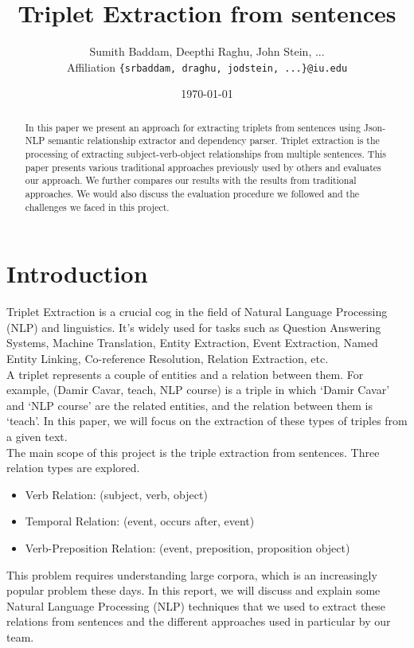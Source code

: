 \documentclass[11pt,letterpaper]{article}
\title{Triplet Extraction from sentences}
\author{Sumith Baddam, Deepthi Raghu, John Stein, ... \\
  Affiliation
  {\tt \{srbaddam, draghu, jodstein, ...\}@iu.edu} \\}
\date{\today}
\begin{document}
\maketitle

\begin{abstract}
  In this paper we present an approach for extracting triplets from sentences using Json-NLP semantic relationship extractor and dependency parser. Triplet extraction is the processing of extracting subject-verb-object relationships from multiple sentences. This paper presents various traditional approaches previously used by others and evaluates our approach. We further compares our results with the results from traditional approaches. We would also discuss the evaluation procedure we followed and the challenges we faced in this project.
\end{abstract}

\section{Introduction}

Triplet Extraction is a crucial cog in the field of Natural Language Processing (NLP) and linguistics. It’s widely used for tasks such as Question Answering Systems, Machine Translation, Entity Extraction, Event Extraction, Named Entity Linking, Co-reference Resolution, Relation Extraction, etc.\\

A triplet represents a couple of entities and a relation between them. For example, (Damir Cavar, teach, NLP course) is a triple in which ‘Damir Cavar’ and ‘NLP course’ are the related entities, and the relation between them is ‘teach’. In this paper, we will focus on the extraction of these types of triples from a given text.\\

The main scope of this project is the triple extraction from sentences. Three relation types are explored.

\begin{itemize}
    \item Verb Relation: (subject, verb, object)
    \item Temporal Relation: (event, occurs after, event)
    \item Verb-Preposition Relation: (event, preposition, proposition object)
\end{itemize}

This problem requires understanding large corpora, which is an increasingly popular problem these days. In this report, we will discuss and explain some Natural Language Processing (NLP) techniques that we used to extract these relations from sentences and the different approaches used in particular by our team.
\end{document}
